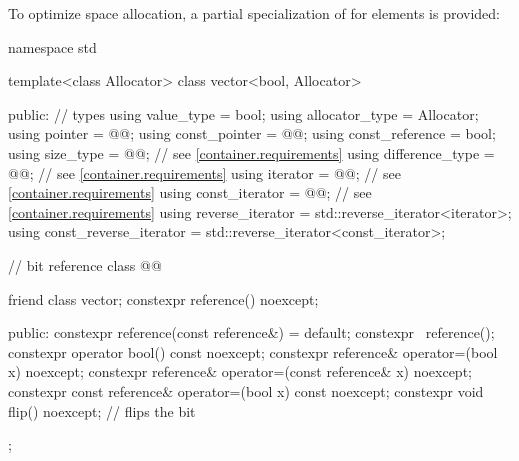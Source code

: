 \pnum
{}%
To optimize space allocation, a partial specialization of  for
 elements is provided:
\begin{codeblock}
namespace std {
  template<class Allocator>
  class vector<bool, Allocator> {
  public:
    // types
    using value_type             = bool;
    using allocator_type         = Allocator;
    using pointer                = @@;
    using const_pointer          = @@;
    using const_reference        = bool;
    using size_type              = @@; // see \ref{container.requirements}
    using difference_type        = @@; // see \ref{container.requirements}
    using iterator               = @@; // see \ref{container.requirements}
    using const_iterator         = @@; // see \ref{container.requirements}
    using reverse_iterator       = std::reverse_iterator<iterator>;
    using const_reverse_iterator = std::reverse_iterator<const_iterator>;

    // bit reference
    class @@ {
      friend class vector;
      constexpr reference() noexcept;

    public:
      constexpr reference(const reference&) = default;
      constexpr ~reference();
      constexpr operator bool() const noexcept;
      constexpr reference& operator=(bool x) noexcept;
      constexpr reference& operator=(const reference& x) noexcept;
      constexpr const reference& operator=(bool x) const noexcept;
      constexpr void flip() noexcept;   // flips the bit
    };

}}
\end{codeblock}
